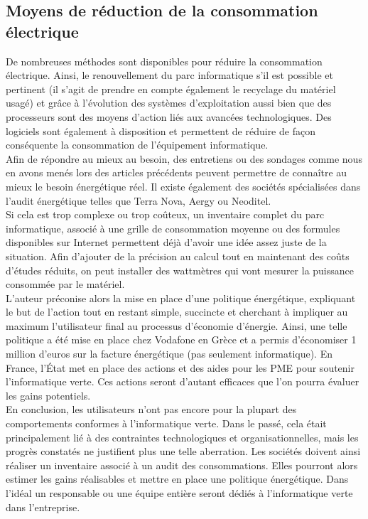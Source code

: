 \documentclass[a4paper,11pt,french]{report}
\begin{document}
\subsection{Moyens de réduction de la consommation électrique}
De nombreuses méthodes sont disponibles pour réduire la consommation électrique. Ainsi, le renouvellement du parc informatique s’il est possible et pertinent (il s’agit de prendre en compte également le recyclage du matériel usagé) et grâce à l’évolution des systèmes d’exploitation aussi bien que des processeurs sont des moyens d’action liés aux avancées technologiques. Des logiciels sont également à disposition et permettent de réduire de façon conséquente la consommation de l’équipement informatique.\\

Afin de répondre au mieux au besoin, des entretiens ou des sondages comme nous en avons menés lors des articles précédents peuvent permettre de connaître au mieux le besoin énergétique réel. Il existe également des sociétés spécialisées dans l’audit énergétique telles que Terra Nova, Aergy ou Neoditel.\\

Si cela est trop complexe ou trop coûteux, un inventaire complet du parc informatique, associé à une grille de consommation moyenne ou des formules disponibles sur Internet permettent déjà d’avoir une idée assez juste de la situation. Afin d’ajouter de la précision au calcul tout en maintenant des coûts d’études réduits, on peut installer des wattmètres qui vont mesurer la puissance consommée par le matériel.\\

L’auteur préconise alors la mise en place d’une politique énergétique, expliquant le but de l’action tout en restant simple, succincte et cherchant à impliquer au maximum l’utilisateur final au processus d’économie d’énergie. Ainsi, une telle politique a été mise en place chez Vodafone en Grèce et a permis d’économiser 1 million d’euros sur la facture énergétique (pas seulement informatique). En France, l’État met en place des actions et des aides pour les PME pour soutenir l’informatique verte. Ces actions seront d’autant efficaces que l’on pourra évaluer les gains potentiels.\\

En conclusion, les utilisateurs n’ont pas encore pour la plupart des comportements conformes à l’informatique verte. Dans le passé, cela était principalement lié à des contraintes technologiques et organisationnelles, mais les progrès constatés ne justifient plus une telle aberration. Les sociétés doivent ainsi réaliser un inventaire associé à un audit des consommations. Elles pourront alors estimer les gains réalisables et mettre en place une politique énergétique. Dans l’idéal un responsable ou une équipe entière seront dédiés à l’informatique verte dans l’entreprise.\\
\end{document}
